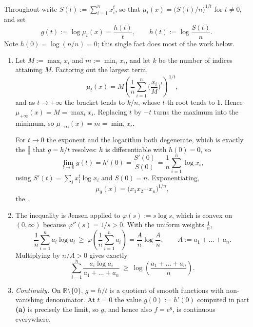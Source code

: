 \begin{exercisesolution}
\label{sol:p_means_monotonicity}
Throughout write $S(t) := \sum_{i=1}^n x_i^t$, so that
$\mu_t(x) = \big(S(t)/n\big)^{1/t}$ for $t \neq 0$, and set
\[g(t) := \log \mu_t(x) = \frac{h(t)}{t}, \qquad h(t) := \log\frac{S(t)}{n}.\]
Note $h(0) = \log(n/n) = 0$; this single fact does most of the work below.
\begin{enumerate}[label=\textbf{(\alph*)}]
  \item Let $M := \max_i x_i$ and $m := \min_i x_i$, and let $k$ be the number of indices
    attaining $M$. Factoring out the largest term,
    \[\mu_t(x) = M\left(\frac{1}{n}\sum_{i=1}^n\Big(\frac{x_i}{M}\Big)^{t}\right)^{1/t},\]
    and as $t \to +\infty$ the bracket tends to $k/n$, whose $t$-th root tends to $1$. Hence
    $\mu_{+\infty}(x) = M = \max_i x_i$. Replacing $t$ by $-t$ turns the maximum into the
    minimum, so $\mu_{-\infty}(x) = m = \min_i x_i$.

    For $t \to 0$ the exponent and the logarithm both degenerate, which is exactly the
    $\tfrac00$ that $g = h/t$ resolves: $h$ is differentiable with $h(0) = 0$, so
    \[\lim_{t\to0} g(t) = h'(0) = \frac{S'(0)}{S(0)} = \frac{1}{n}\sum_{i=1}^n \log x_i,\]
    using $S'(t) = \sum_i x_i^t\log x_i$ and $S(0) = n$. Exponentiating,
    \[\mu_0(x) = \big(x_1x_2\cdots x_n\big)^{1/n},\]
    the  .
  \item The inequality is Jensen applied to $\varphi(s) := s\log s$, which is convex on
    $(0,\infty)$ because $\varphi''(s) = 1/s > 0$. With the uniform weights $\tfrac1n$,
    \[\frac{1}{n}\sum_{i=1}^n a_i\log a_i \ \geq\ \varphi\!\left(\frac{1}{n}\sum_{i=1}^n a_i\right)
      = \frac{A}{n}\log\frac{A}{n}, \qquad A := a_1 + \dots + a_n.\]
    Multiplying by $n/A > 0$ gives exactly
    \[\sum_{i=1}^n \frac{a_i\log a_i}{a_1+\dots+a_n} \ \geq\ \log\!\left(\frac{a_1+\dots+a_n}{n}\right).\]
  \item \textit{Continuity.} On $\mathbb{R}\setminus\{0\}$, $g = h/t$ is a quotient of smooth
    functions with non-vanishing denominator. At $t = 0$ the value $g(0) := h'(0)$ computed in
    part \textbf{(a)} is precisely the limit, so $g$, and hence also $f = e^{g}$, is continuous
    everywhere.


\end{enumerate}
\end{exercisesolution}

